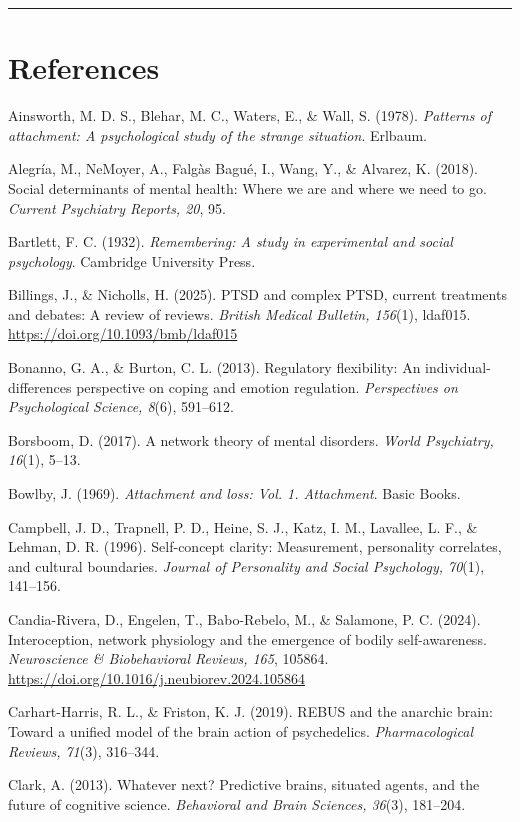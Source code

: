 \documentclass[
  11pt,
]{article}
\begin{document}
\begin{center}\rule{0.5\linewidth}{0.5pt}\end{center}

\section{References}\label{references}

Ainsworth, M. D. S., Blehar, M. C., Waters, E., \& Wall, S. (1978).
\emph{Patterns of attachment: A psychological study of the strange
situation}. Erlbaum.

Alegría, M., NeMoyer, A., Falgàs Bagué, I., Wang, Y., \& Alvarez, K.
(2018). Social determinants of mental health: Where we are and where we
need to go. \emph{Current Psychiatry Reports, 20}, 95.

Bartlett, F. C. (1932). \emph{Remembering: A study in experimental and
social psychology}. Cambridge University Press.

Billings, J., \& Nicholls, H. (2025). PTSD and complex PTSD, current
treatments and debates: A review of reviews. \emph{British Medical
Bulletin, 156}(1), ldaf015. \url{https://doi.org/10.1093/bmb/ldaf015}

Bonanno, G. A., \& Burton, C. L. (2013). Regulatory flexibility: An
individual-differences perspective on coping and emotion regulation.
\emph{Perspectives on Psychological Science, 8}(6), 591--612.

Borsboom, D. (2017). A network theory of mental disorders. \emph{World
Psychiatry, 16}(1), 5--13.

Bowlby, J. (1969). \emph{Attachment and loss: Vol. 1. Attachment}. Basic
Books.

Campbell, J. D., Trapnell, P. D., Heine, S. J., Katz, I. M., Lavallee,
L. F., \& Lehman, D. R. (1996). Self-concept clarity: Measurement,
personality correlates, and cultural boundaries. \emph{Journal of
Personality and Social Psychology, 70}(1), 141--156.

Candia-Rivera, D., Engelen, T., Babo-Rebelo, M., \& Salamone, P. C.
(2024). Interoception, network physiology and the emergence of bodily
self-awareness. \emph{Neuroscience \& Biobehavioral Reviews, 165},
105864. \url{https://doi.org/10.1016/j.neubiorev.2024.105864}

Carhart-Harris, R. L., \& Friston, K. J. (2019). REBUS and the anarchic
brain: Toward a unified model of the brain action of psychedelics.
\emph{Pharmacological Reviews, 71}(3), 316--344.

Clark, A. (2013). Whatever next? Predictive brains, situated agents, and
the future of cognitive science. \emph{Behavioral and Brain Sciences,
36}(3), 181--204.
\end{document}
